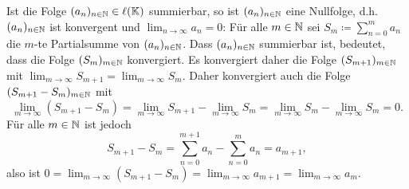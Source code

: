 \begin{bem}
 Ist die Folge $(a_n)_{n \in \mathbb{N}} \in \ell(\mathbb{K})$ summierbar, so ist $(a_n)_{n \in \mathbb{N}}$ eine Nullfolge, d.h.\ $(a_n)_{n \in \mathbb{N}}$ ist konvergent und $\lim_{n \to \infty} a_n = 0$: Für alle $m \in \mathbb{N}$ sei $S_m \coloneqq \sum_{n=0}^m a_n$ die $m$-te Partialsumme von $(a_n)_{n \in \mathbb{N}}$. Dass $(a_n)_{n \in \mathbb{N}}$ summierbar ist, bedeutet, dass die Folge $(S_m)_{m \in \mathbb{N}}$ konvergiert. Es konvergiert daher die Folge $(S_{m+1})_{m \in \mathbb{N}}$ mit $\lim_{m \to \infty} S_{m+1} = \lim_{m \to \infty} S_m$. Daher konvergiert auch die Folge $(S_{m+1} - S_m)_{m \in \mathbb{N}}$ mit
 \[
  \lim_{m \to \infty} (S_{m+1} - S_m)
  = \lim_{m \to \infty} S_{m+1} - \lim_{m \to \infty} S_m
  = \lim_{m \to \infty} S_m - \lim_{m \to \infty} S_m
  = 0.
 \]
 Für alle $m \in \mathbb{N}$ ist jedoch
 \[
  S_{m+1} - S_m
  = \sum_{n=0}^{m+1} a_n - \sum_{n=0}^m a_n
  = a_{m+1},
 \]
 also ist $0 = \lim_{m \to \infty} (S_{m+1} - S_m) = \lim_{m \to \infty} a_{m+1} = \lim_{m \to \infty} a_m$.
\end{bem}